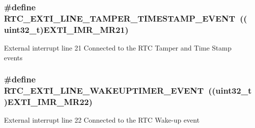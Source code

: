 \subsubsection[{\texorpdfstring{R\+T\+C\+\_\+\+E\+X\+T\+I\+\_\+\+L\+I\+N\+E\+\_\+\+T\+A\+M\+P\+E\+R\+\_\+\+T\+I\+M\+E\+S\+T\+A\+M\+P\+\_\+\+E\+V\+E\+NT}{RTC_EXTI_LINE_TAMPER_TIMESTAMP_EVENT}}]{\setlength{\rightskip}{0pt plus 5cm}\#define R\+T\+C\+\_\+\+E\+X\+T\+I\+\_\+\+L\+I\+N\+E\+\_\+\+T\+A\+M\+P\+E\+R\+\_\+\+T\+I\+M\+E\+S\+T\+A\+M\+P\+\_\+\+E\+V\+E\+NT~((uint32\+\_\+t){\bf E\+X\+T\+I\+\_\+\+I\+M\+R\+\_\+\+M\+R21})}\hypertarget{group___r_t_c_ex___private___constants_gaffa3448885f1dec216899aef7f49471f}{}\label{group___r_t_c_ex___private___constants_gaffa3448885f1dec216899aef7f49471f}
External interrupt line 21 Connected to the R\+TC Tamper and Time Stamp events 
\subsubsection[{\texorpdfstring{R\+T\+C\+\_\+\+E\+X\+T\+I\+\_\+\+L\+I\+N\+E\+\_\+\+W\+A\+K\+E\+U\+P\+T\+I\+M\+E\+R\+\_\+\+E\+V\+E\+NT}{RTC_EXTI_LINE_WAKEUPTIMER_EVENT}}]{\setlength{\rightskip}{0pt plus 5cm}\#define R\+T\+C\+\_\+\+E\+X\+T\+I\+\_\+\+L\+I\+N\+E\+\_\+\+W\+A\+K\+E\+U\+P\+T\+I\+M\+E\+R\+\_\+\+E\+V\+E\+NT~((uint32\+\_\+t){\bf E\+X\+T\+I\+\_\+\+I\+M\+R\+\_\+\+M\+R22})}\hypertarget{group___r_t_c_ex___private___constants_ga1a1a58e244663850786c387bfa5474f2}{}\label{group___r_t_c_ex___private___constants_ga1a1a58e244663850786c387bfa5474f2}
External interrupt line 22 Connected to the R\+TC Wake-\/up event 